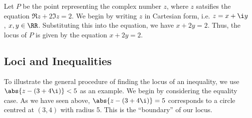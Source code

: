 \begin{example}
    Let $P$ be the point representing the complex number $z$, where $z$ satsifies the equation $\Re z + 2 \Im z = 2$. We begin by writing $z$ in Cartesian form, i.e. $z = x + \i y$, $x, y \in \RR$. Substituting this into the equation, we have $x + 2y = 2$. Thus, the locus of $P$ is given by the equation $x + 2y = 2$.
\end{example}

\subsection{Loci and Inequalities}

To illustrate the general procedure of finding the locus of an inequality, we use $\abs{z - (3 + 4\i)} < 5$ as an example. We begin by considering the equality case. As we have seen above, $\abs{z - (3 + 4\i)} = 5$ corresponds to a circle centred at $(3, 4)$ with radius 5. This is the ``boundary'' of our locus.

\begin{figure}[H]
    \centering
    \caption{}
\end{figure}

